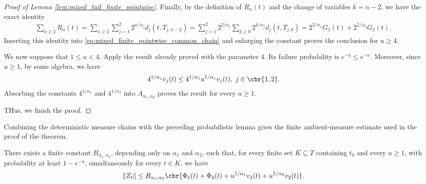 \documentclass[11pt]{article}
\begin{document}
\begin{proof}[Proof of Lemma
\ref{lem:mixed_tail_finite_pointwise}]
Finally, by the definition of $R_n(t)$ and the change of variables
$k=n-2$, we have the exact identity
\begin{align*}
\sum_{n\ge2}R_n(t)=
\sum_{n\ge2}
\sum_{j=1}^2
2^{n/\alpha_j}d_j(t,T_{j,n-2})=
\sum_{j=1}^2
2^{2/\alpha_j}
\sum_{k\ge0}
2^{k/\alpha_j}d_j(t,T_{j,k})=
2^{2/\alpha_1}G_1(t)
+
2^{2/\alpha_2}G_2(t).
\end{align*}
Inserting this identity into
\eqref{eq:mixed_finite_pointwise_common_chain} and enlarging the
constant proves the conclusion for $u\ge4$.

We now suppose that $1\le u<4$. Apply the result already proved with
the parameter $4$. Its failure probability is $e^{-4}\le e^{-u}$.
Moreover, since $u\ge1$, by some algebra, we have
\begin{align*}
4^{1/\alpha_j}v_j(t)
\le
4^{1/\alpha_j}
u^{1/\alpha_j}v_j(t),
\ j\in\cbr{1,2}.
\end{align*}
Absorbing the constants $4^{1/\alpha_1}$ and
$4^{1/\alpha_2}$ into $A_{\alpha_1,\alpha_2}$ proves the result for
every $u\ge1$.

THus, we finish the proof.
\end{proof}

Combining the deterministic measure chains with the preceding
probabilistic lemma gives the finite ambient-measure estimate used in
the proof of the theorem.

\begin{lemma}
\label{lem:mixed_tail_finite_ambient_pointwise}
There exists a finite constant $B_{\alpha_1,\alpha_2}$, depending only
on $\alpha_1$ and $\alpha_2$, such that, for every finite set
$K\subseteq T$ containing $t_0$ and every $u\ge1$, with probability at
least $1-e^{-u}$, simultaneously for every $t\in K$, we have
\begin{align*}
\|Z_t\|
\le
B_{\alpha_1,\alpha_2}
\cbr{
\Phi_1(t)+\Phi_2(t)
+
u^{1/\alpha_1}v_1(t)
+
u^{1/\alpha_2}v_2(t)
}.
\end{align*}
\end{lemma}
\end{document}
